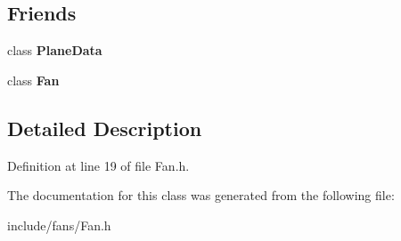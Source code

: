 \subsection*{Friends}
\begin{DoxyCompactItemize}
\item 
\mbox{\label{class_base_gas_density_a28ff438eefb65e97bddb4051dd0a0112}} 
class {\bfseries Plane\+Data}
\item 
\mbox{\label{class_base_gas_density_a0a305abd4183ca4b5d3adb1b563378d7}} 
class {\bfseries Fan}
\end{DoxyCompactItemize}


\subsection{Detailed Description}


Definition at line 19 of file Fan.\+h.



The documentation for this class was generated from the following file\+:\begin{DoxyCompactItemize}
\item 
include/fans/Fan.\+h\end{DoxyCompactItemize}
